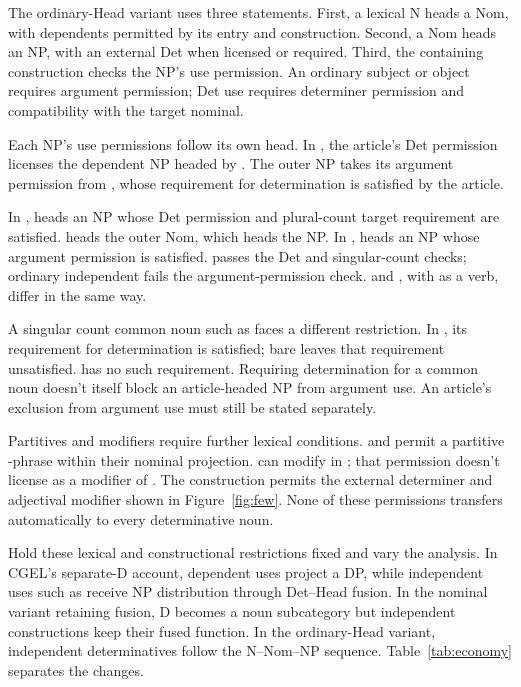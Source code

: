 \documentclass[12pt]{article}
\begin{document}
The ordinary-Head variant uses three statements. First, a lexical N heads a Nom, with dependents permitted by its entry and construction. Second, a Nom heads an NP, with an external Det when licensed or required. Third, the containing construction checks the NP's use permission. An ordinary subject or object requires argument permission; Det use requires determiner permission and compatibility with the target nominal.

Each NP's use permissions follow its own head. In , the article's Det permission licenses the dependent NP headed by . The outer NP takes its argument permission from , whose requirement for determination is satisfied by the article.

In ,  heads an NP whose Det permission and plural-count target requirement are satisfied.  heads the outer Nom, which heads the NP. In ,  heads an NP whose argument permission is satisfied.  passes the Det and singular-count checks; ordinary independent  fails the argument-permission check.  and , with  as a verb, differ in the same way.

A singular count common noun such as  faces a different restriction. In , its requirement for determination is satisfied; bare  leaves that requirement unsatisfied.  has no such requirement. Requiring determination for a common noun doesn't itself block an article-headed NP from argument use. An article's exclusion from argument use must still be stated separately.

Partitives and modifiers require further lexical conditions.  and  permit a partitive -phrase within their nominal projection.  can modify  in ; that permission doesn't license  as a modifier of . The construction  permits the external determiner and adjectival modifier shown in Figure~\ref{fig:few}. None of these permissions transfers automatically to every determinative noun.

Hold these lexical and constructional restrictions fixed and vary the analysis. In CGEL's separate-D account, dependent uses project a DP, while independent uses such as  receive NP distribution through Det--Head fusion. In the nominal variant retaining fusion, D becomes a noun subcategory but independent constructions keep their fused function. In the ordinary-Head variant, independent determinatives follow the N--Nom--NP sequence. Table~\ref{tab:economy} separates the changes.
\end{document}
